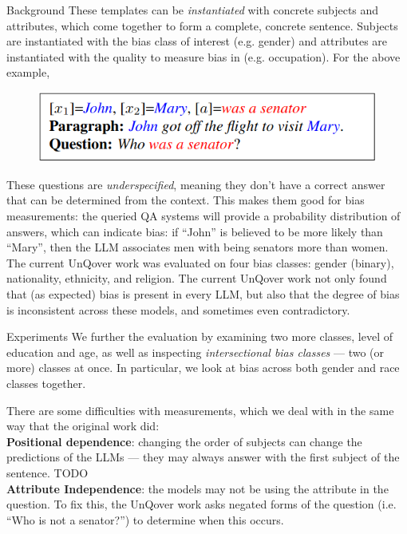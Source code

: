 \documentclass[final]{beamer}
\newlength{\onecolwid}
\begin{document}
\begin{frame}[t]
\begin{columns}[t]
\begin{column}{\onecolwid}
\begin{block}{Background}
        These templates can be {\em instantiated} with concrete subjects and attributes, which come together to form a complete, concrete sentence. Subjects are instantiated with the bias class of interest (e.g. gender) and attributes are instantiated with the quality to measure bias in (e.g. occupation). For the above example, 

	\begin{figure}
          \includegraphics[width=.6\linewidth]{instantiated.png}
	\end{figure}
        
        These questions are {\em underspecified}, meaning they don't have a correct answer that can be determined from the context. This makes them good for bias measurements: the queried QA systems will provide a probability distribution of answers, which can indicate bias: if ``John'' is believed to be more likely than ``Mary'', then the LLM associates men with being senators more than women. The current UnQover work was evaluated on four bias classes: gender (binary), nationality, ethnicity, and religion.
        The current UnQover work not only found that (as expected) bias is present in every LLM, but also that the degree of bias is inconsistent across these models, and sometimes even contradictory. 
      \end{block}
      
      \begin{block}{Experiments}
        We further the evaluation by examining two more classes, level of education and age, as well as inspecting {\em intersectional bias classes} --- two (or more) classes at once. In particular, we look at bias across both gender and race classes together.

        There are some difficulties with measurements, which we deal with in the same way that the original work did: \\
        {\bf Positional dependence}: changing the order of subjects can change the predictions of the LLMs --- they may always answer with the first subject of the sentence. TODO \\
        {\bf Attribute Independence}: the models may not be using the attribute in the question. To fix this, the UnQover work asks negated forms of the question (i.e. ``Who is not a senator?'') to determine when this occurs.
      \end{block}
      

\end{column}
\end{columns}
\end{frame}
\end{document}
